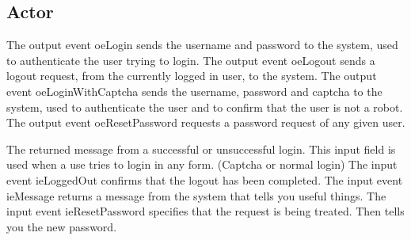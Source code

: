 \subsection{ Actor}


\begin{actortable}
	
	
	
	
	

			{The output event oeLogin sends the username and password to the system, used to authenticate the user trying to login.}
			{The output event oeLogout sends a logout request, from the currently logged in user, to the system.}
			{The output event oeLoginWithCaptcha sends the username, password and captcha to the system, used to authenticate the user and
			to confirm that the user is not a robot.}
			{The output event oeResetPassword requests a password request of any given user.}
	
							 {The returned message from a successful or unsuccessful login. This input field is used when a use tries to login in any form.
							 (Captcha or normal login)}
							 {The input event ieLoggedOut confirms that the logout has been completed.}
							 {The input event ieMessage returns a message from the system that tells you useful things.}
							 {The input event ieResetPassword specifies that the request is being treated. Then tells you the new password.}
	
\end{actortable}
